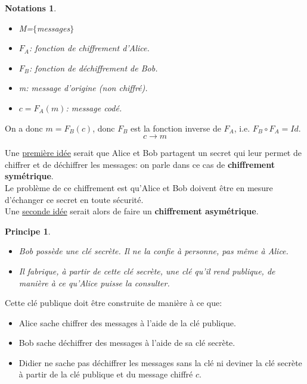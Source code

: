 \documentclass[12pt]{report}
\newtheorem*{prin}{Principe}
\newtheorem*{notas}{Notations}
\begin{document}
\begin{notas}\
\begin{itemize}
\item[•] M=$\{$messages$\}$
\item[•] $F_A$: fonction de chiffrement d'Alice.
\item[•] $F_B$: fonction de déchiffrement de Bob.
\item[•] m: message d'origine (non chiffré).
\item[•] $c=F_A(m)$: message codé.
\end{itemize}
\end{notas}

On a donc $m=F_B(c)$, donc $F_B$ est la fonction inverse de $F_A$, i.e. $F_B \circ F_A =Id$.
$$      c \longrightarrow m      $$

Une \underline{première idée} serait que Alice et Bob partagent un secret qui leur permet de chiffrer et de déchiffrer les messages: on parle dans ce cas de \textbf{chiffrement symétrique}.\\

Le problème de ce chiffrement est qu'Alice et Bob doivent être en mesure d'échanger ce secret en toute sécurité.\\

Une \underline{seconde idée} serait alors de faire un \textbf{chiffrement asymétrique}.

\begin{prin}\
\begin{itemize}
\item[•] Bob possède une clé secrète. Il ne la confie à personne, pas même à Alice.
\item[•] Il fabrique, à partir de cette clé secrète, une clé qu'il rend publique, de manière à ce qu'Alice puisse la consulter.
\end{itemize}
\end{prin}

Cette clé publique doit être construite de manière à ce que:
\begin{itemize}
\item[•] Alice sache chiffrer des messages à l'aide de la clé publique.
\item[•] Bob sache déchiffrer des messages à l'aide de sa clé secrète.
\item[•] Didier ne sache pas déchiffrer les messages sans la clé ni deviner la clé secrète à partir de la clé publique et du message chiffré $c$. 
\end{itemize}
\end{document}

